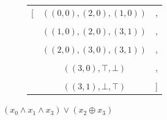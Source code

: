 \documentclass[english, aspectratio=169]{beamer}
\newcommand{\triple}[3]{\ensuremath{(#1, #2, #3)}}
\begin{document}
\begin{frame}
  \begin{figure}
    \centering

    \begin{subfigure}{0.49\linewidth}
      \centering

      \begin{subfigure}[b]{0.33\linewidth}
        \centering

        \begin{tikzpicture}[scale=0.6, every node/.style={transform shape}]
          
        \end{tikzpicture}
      \end{subfigure}
      \begin{subfigure}[b]{0.55\linewidth}
        \centering
        { \tiny
          \begin{tabular}{r c l}
            [ & $\triple{(0,0)}{(2,0)}{(1,0)}$ & ,
            \\ \\
              & $\triple{(1,0)}{(2,0)}{(3,1)}$ & ,
            \\ \\
              & $\triple{(2,0)}{(3,0)}{(3,1)}$ & ,
            \\ \\
              & $\triple{(3,0)}{\top}{\bot}$   & ,
            \\ \\
              & $\triple{(3,1)}{\bot}{\top}$   & ]
          \end{tabular}
          \vspace{6pt}
        }
      \end{subfigure}

      \caption{$(x_0 \wedge x_1 \wedge x_3) \vee (x_2 \oplus x_3)$}
    \end{subfigure}
    \begin{subfigure}{0.49\linewidth}
      \centering


\end{subfigure}
\end{figure}
\end{frame}
\end{document}
